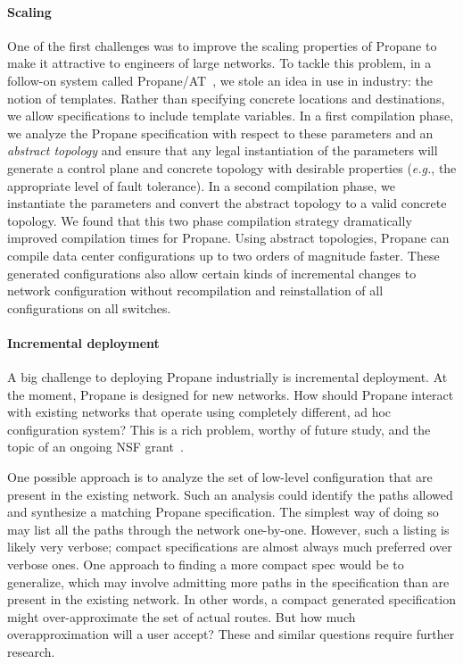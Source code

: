 \documentclass[10pt]{sigalternate052015}
\begin{document}
\paragraph*{Scaling} One of the first challenges was to improve the scaling
properties of Propane to make it attractive to engineers of large
networks.  To tackle this problem, in a follow-on system called Propane/AT~\cite{abstract-propane}, we stole an idea in use in
industry: the notion of templates.  Rather than specifying concrete
locations and destinations, we allow specifications to include
template variables.  In a first compilation phase, we analyze the
Propane specification with respect to these parameters and an
\emph{abstract topology} and ensure that any legal instantiation of
the parameters will generate a control plane and concrete topology
with desirable properties (\emph{e.g.}, the appropriate level of fault
tolerance).  In a second compilation phase, we instantiate the
parameters and convert the abstract topology to a valid concrete
topology.  We found that this two phase compilation strategy
dramatically improved compilation times for Propane.  Using abstract
topologies, Propane can compile data center configurations up to two
orders of magnitude faster.  These generated configurations also
allow certain kinds of incremental changes to network configuration
without recompilation and reinstallation of all configurations on all
switches.  

\paragraph*{Incremental deployment}  A big challenge to
deploying Propane industrially is incremental deployment. 
At the moment, Propane is designed for new
networks. How should Propane interact
with existing networks that operate using completely different, ad
hoc configuration system?  This is a rich problem, worthy of future
study, and the topic of an ongoing NSF grant~\cite{nsf-propane}.

One possible approach is to analyze the set of
low-level configuration that are present in the existing
network.  Such an analysis could identify the paths allowed and
synthesize a matching Propane specification.  The simplest way of
doing so may list all the paths through the network one-by-one.
However, such a listing is likely very verbose; compact specifications
are almost always much preferred over verbose ones.  One approach to
finding a more compact spec would be to generalize, which may involve
admitting more paths in the specification than are present in the
existing network.  In other words, a compact generated specification
might over-approximate the set of actual routes.  But how much
overapproximation will a user accept?  These and similar questions
require further research.  
\end{document}

